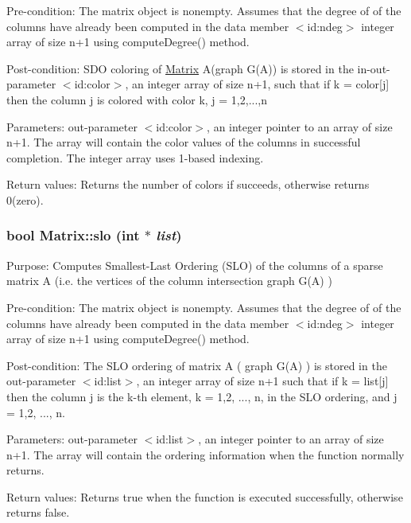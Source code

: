 Pre-\/condition: The matrix object is nonempty. Assumes that the degree of of the columns have already been computed in the data member $<$id:ndeg$>$ integer array of size n+1 using computeDegree() method.

Post-\/condition: SDO coloring of \hyperlink{classMatrix}{Matrix} A(graph G(A)) is stored in the in-\/out-\/parameter $<$id:color$>$, an integer array of size n+1, such that if k = color\mbox{[}j\mbox{]} then the column j is colored with color k, j = 1,2,...,n

Parameters: out-\/parameter $<$id:color$>$, an integer pointer to an array of size n+1. The array will contain the color values of the columns in successful completion. The integer array uses 1-\/based indexing.

Return values: Returns the number of colors if succeeds, otherwise returns 0(zero). \hypertarget{classMatrix_ac7e287f032e1296c51ce29704a0af704}{
\subsubsection[{slo}]{\setlength{\rightskip}{0pt plus 5cm}bool Matrix::slo (int $\ast$ {\em list})}}
\label{classMatrix_ac7e287f032e1296c51ce29704a0af704}
Purpose: Computes Smallest-\/Last Ordering (SLO) of the columns of a sparse matrix A (i.e. the vertices of the column intersection graph G(A) )

Pre-\/condition: The matrix object is nonempty. Assumes that the degree of of the columns have already been computed in the data member $<$id:ndeg$>$ integer array of size n+1 using computeDegree() method.

Post-\/condition: The SLO ordering of matrix A ( graph G(A) ) is stored in the out-\/parameter $<$id:list$>$, an integer array of size n+1 such that if k = list\mbox{[}j\mbox{]} then the column j is the k-\/th element, k = 1,2, ..., n, in the SLO ordering, and j = 1,2, ..., n.

Parameters: out-\/parameter $<$id:list$>$, an integer pointer to an array of size n+1. The array will contain the ordering information when the function normally returns.

Return values: Returns true when the function is executed successfully, otherwise returns false. 

